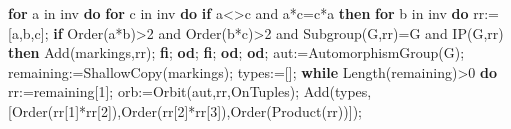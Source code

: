 \documentclass[
  11pt,
  a4paper,
]{article}
\newenvironment{Shaded}{}{}
\newcommand{\BuiltInTok}[1]{\textcolor[rgb]{0.00,0.50,0.00}{#1}}
\newcommand{\ConstantTok}[1]{\textcolor[rgb]{0.53,0.00,0.00}{#1}}
\newcommand{\ControlFlowTok}[1]{\textcolor[rgb]{0.00,0.44,0.13}{\textbf{#1}}}
\newcommand{\ExtensionTok}[1]{#1}
\newcommand{\FloatTok}[1]{\textcolor[rgb]{0.25,0.63,0.44}{#1}}
\newcommand{\NormalTok}[1]{#1}
\newcommand{\OperatorTok}[1]{\textcolor[rgb]{0.40,0.40,0.40}{#1}}
\newcommand{\VariableTok}[1]{\textcolor[rgb]{0.10,0.09,0.49}{#1}}
\begin{document}
\begin{Shaded}
\begin{Highlighting}[]
  \ControlFlowTok{for} \VariableTok{a} \ExtensionTok{in} \VariableTok{inv} \ControlFlowTok{do} \ControlFlowTok{for} \VariableTok{c} \ExtensionTok{in} \VariableTok{inv} \ControlFlowTok{do} \ControlFlowTok{if} \VariableTok{a}\OperatorTok{\textless{}\textgreater{}}\VariableTok{c} \ConstantTok{and} \VariableTok{a}\OperatorTok{*}\VariableTok{c}\OperatorTok{=}\VariableTok{c}\OperatorTok{*}\VariableTok{a} \ControlFlowTok{then}
    \ControlFlowTok{for} \VariableTok{b} \ExtensionTok{in} \VariableTok{inv} \ControlFlowTok{do} \VariableTok{rr}\OperatorTok{:=}\NormalTok{[}\VariableTok{a}\OperatorTok{,}\VariableTok{b}\OperatorTok{,}\VariableTok{c}\NormalTok{]}\OperatorTok{;}
      \ControlFlowTok{if} \BuiltInTok{Order}\NormalTok{(}\VariableTok{a}\OperatorTok{*}\VariableTok{b}\NormalTok{)}\OperatorTok{\textgreater{}}\FloatTok{2} \ConstantTok{and} \BuiltInTok{Order}\NormalTok{(}\VariableTok{b}\OperatorTok{*}\VariableTok{c}\NormalTok{)}\OperatorTok{\textgreater{}}\FloatTok{2} \ConstantTok{and} \BuiltInTok{Subgroup}\NormalTok{(}\VariableTok{G}\OperatorTok{,}\VariableTok{rr}\NormalTok{)}\OperatorTok{=}\VariableTok{G} \ConstantTok{and} \VariableTok{IP}\NormalTok{(}\VariableTok{G}\OperatorTok{,}\VariableTok{rr}\NormalTok{) }\ControlFlowTok{then} \BuiltInTok{Add}\NormalTok{(}\VariableTok{markings}\OperatorTok{,}\VariableTok{rr}\NormalTok{)}\OperatorTok{;} \ControlFlowTok{fi}\OperatorTok{;}
    \ControlFlowTok{od}\OperatorTok{;}
  \ControlFlowTok{fi}\OperatorTok{;} \ControlFlowTok{od}\OperatorTok{;} \ControlFlowTok{od}\OperatorTok{;}
  \VariableTok{aut}\OperatorTok{:=}\BuiltInTok{AutomorphismGroup}\NormalTok{(}\VariableTok{G}\NormalTok{)}\OperatorTok{;} \VariableTok{remaining}\OperatorTok{:=}\BuiltInTok{ShallowCopy}\NormalTok{(}\VariableTok{markings}\NormalTok{)}\OperatorTok{;} \VariableTok{types}\OperatorTok{:=}\NormalTok{[]}\OperatorTok{;}
  \ControlFlowTok{while} \BuiltInTok{Length}\NormalTok{(}\VariableTok{remaining}\NormalTok{)}\OperatorTok{\textgreater{}}\FloatTok{0} \ControlFlowTok{do}
    \VariableTok{rr}\OperatorTok{:=}\VariableTok{remaining}\NormalTok{[}\FloatTok{1}\NormalTok{]}\OperatorTok{;} \VariableTok{orb}\OperatorTok{:=}\BuiltInTok{Orbit}\NormalTok{(}\VariableTok{aut}\OperatorTok{,}\VariableTok{rr}\OperatorTok{,}\BuiltInTok{OnTuples}\NormalTok{)}\OperatorTok{;}
    \BuiltInTok{Add}\NormalTok{(}\VariableTok{types}\OperatorTok{,}\NormalTok{[}\BuiltInTok{Order}\NormalTok{(}\VariableTok{rr}\NormalTok{[}\FloatTok{1}\NormalTok{]}\OperatorTok{*}\VariableTok{rr}\NormalTok{[}\FloatTok{2}\NormalTok{])}\OperatorTok{,}\BuiltInTok{Order}\NormalTok{(}\VariableTok{rr}\NormalTok{[}\FloatTok{2}\NormalTok{]}\OperatorTok{*}\VariableTok{rr}\NormalTok{[}\FloatTok{3}\NormalTok{])}\OperatorTok{,}\BuiltInTok{Order}\NormalTok{(}\BuiltInTok{Product}\NormalTok{(}\VariableTok{rr}\NormalTok{))])}\OperatorTok{;}

\end{Highlighting}
\end{Shaded}
\end{document}

